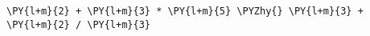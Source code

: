\begin{Verbatim}[commandchars=\\\{\}]
\PY{l+m}{2} + \PY{l+m}{3} * \PY{l+m}{5} \PYZhy{} \PY{l+m}{3} + \PY{l+m}{2} / \PY{l+m}{3}
\end{Verbatim}
